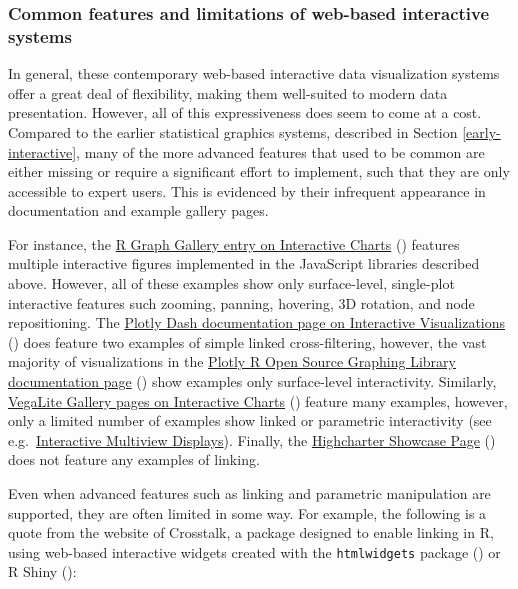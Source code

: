 \documentclass[
]{book}
\theoremstyle{definition}
\theoremstyle{definition}
\theoremstyle{definition}
\theoremstyle{definition}
\theoremstyle{remark}
\begin{document}
\subsubsection{Common features and limitations of web-based interactive systems}\label{common-features-and-limitations-of-web-based-interactive-systems}

In general, these contemporary web-based interactive data visualization systems offer a great deal of flexibility, making them well-suited to modern data presentation. However, all of this expressiveness does seem to come at a cost. Compared to the earlier statistical graphics systems, described in Section \ref{early-interactive}, many of the more advanced features that used to be common are either missing or require a significant effort to implement, such that they are only accessible to expert users. This is evidenced by their infrequent appearance in documentation and example gallery pages.

For instance, the \href{https://r-graph-gallery.com/interactive-charts.html}{R Graph Gallery entry on Interactive Charts} () features multiple interactive figures implemented in the JavaScript libraries described above. However, all of these examples show only surface-level, single-plot interactive features such zooming, panning, hovering, 3D rotation, and node repositioning. The \href{https://dash.plotly.com/interactive-graphing}{Plotly Dash documentation page on Interactive Visualizations} () does feature two examples of simple linked cross-filtering, however, the vast majority of visualizations in the \href{https://plotly.com/r/}{Plotly R Open Source Graphing Library documentation page} () show examples only surface-level interactivity. Similarly, \href{https://vega.github.io/vega-lite/examples/\#interactive-charts}{VegaLite Gallery pages on Interactive Charts} () feature many examples, however, only a limited number of examples show linked or parametric interactivity (see e.g.~\href{https://vega.github.io/vega-lite/examples/\#interactive-multi-view-displays}{Interactive Multiview Displays}). Finally, the \href{https://jkunst.com/highcharter/articles/showcase.html}{Highcharter Showcase Page} () does not feature any examples of linking.

Even when advanced features such as linking and parametric manipulation are supported, they are often limited in some way. For example, the following is a quote from the website of Crosstalk, a package designed to enable linking in R, using web-based interactive widgets created with the \texttt{htmlwidgets} package () or R Shiny ():
\end{document}
